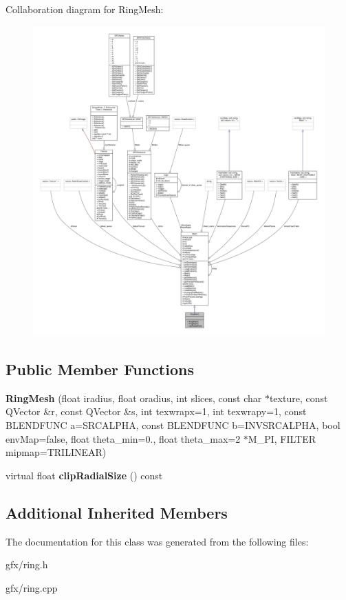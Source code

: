 Collaboration diagram for Ring\+Mesh\+:
\nopagebreak
\begin{figure}[H]
\begin{center}
\leavevmode
\includegraphics[width=350pt]{da/d2f/classRingMesh__coll__graph}
\end{center}
\end{figure}
\subsection*{Public Member Functions}
\begin{DoxyCompactItemize}
\item 
{\bfseries Ring\+Mesh} (float iradius, float oradius, int slices, const char $\ast$texture, const Q\+Vector \&r, const Q\+Vector \&s, int texwrapx=1, int texwrapy=1, const B\+L\+E\+N\+D\+F\+U\+NC a=S\+R\+C\+A\+L\+P\+HA, const B\+L\+E\+N\+D\+F\+U\+NC b=I\+N\+V\+S\+R\+C\+A\+L\+P\+HA, bool env\+Map=false, float theta\+\_\+min=0., float theta\+\_\+max=2 $\ast$M\+\_\+\+PI, F\+I\+L\+T\+ER mipmap=T\+R\+I\+L\+I\+N\+E\+AR)\hypertarget{classRingMesh_ab63efefdd2b2e8917b9ccdfc7094d480}{}\label{classRingMesh_ab63efefdd2b2e8917b9ccdfc7094d480}

\item 
virtual float {\bfseries clip\+Radial\+Size} () const \hypertarget{classRingMesh_a5cf9c9c7af2206fc0d190a4869192bb9}{}\label{classRingMesh_a5cf9c9c7af2206fc0d190a4869192bb9}

\end{DoxyCompactItemize}
\subsection*{Additional Inherited Members}


The documentation for this class was generated from the following files\+:\begin{DoxyCompactItemize}
\item 
gfx/ring.\+h\item 
gfx/ring.\+cpp\end{DoxyCompactItemize}
